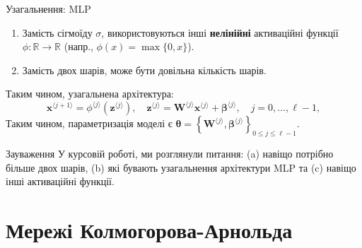 \documentclass{zkdl-presentation-template}
\begin{document}
    \begin{frame}{Узагальнення: MLP}
        \begin{enumerate}
            \item Замість сігмоїду $\sigma$, використовуються інші \textbf{нелінійні}
            активаційні функції $\phi: \mathbb{R} \to \mathbb{R}$ (напр., $\phi(x) = \max\{0,x\}$).\pause
            \item Замість двох шарів, може бути довільна кількість шарів.\pause
        \end{enumerate}

        \begin{definition}\label{def:mlp}
            Таким чином, узагальнена архітектура:
            \begin{equation*}
                \boldsymbol{x}^{\langle j+1 \rangle} = \phi^{\langle j \rangle}(\boldsymbol{z}^{\langle j \rangle}), \quad \boldsymbol{z}^{\langle j \rangle} = \boldsymbol{W}^{\langle j \rangle}\boldsymbol{x}^{\langle j \rangle} + \boldsymbol{\beta}^{\langle j \rangle}, \quad j = 0,\dots,\ell-1,
            \end{equation*}
            Таким чином, параметризація моделі є $\boldsymbol{\theta} =
            \left\{\boldsymbol{W}^{\langle j \rangle},\boldsymbol{\beta}^{\langle j
            \rangle}\right\}_{0 \leq j \leq \ell-1}$.
        \end{definition}

        \begin{alertblock}{Зауваження}
            \pause У курсовій роботі, ми розглянули питання: (a) навіщо потрібно більше двох шарів, (b) які бувають узагальнення архітектури MLP та (c) навіщо інші активаційні функції.
        \end{alertblock}
    \end{frame}

    \section{Мережі Колмогорова-Арнольда}
\end{document}
